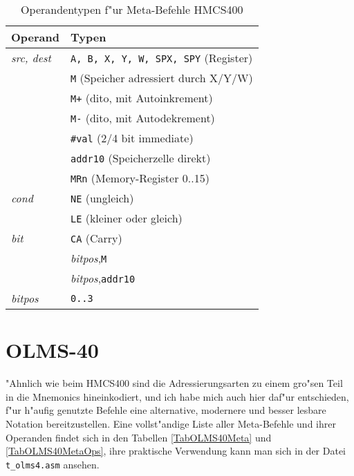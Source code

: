 \documentclass[12pt,a4paper,twoside]{report}
\newcommand{\tty}[1]{{\tt #1}}
\begin{document}
\begin{table*}
\begin{center}\begin{tabular}{|l|l|}
\hline
Operand                 & Typen \\
\hline
{\em src, dest}         & \tty{A, B, X, Y, W, SPX, SPY} (Register) \\
                        & \tty{M} (Speicher adressiert durch X/Y/W) \\
                        & \tty{M+} (dito, mit Autoinkrement) \\
                        & \tty{M-} (dito, mit Autodekrement) \\
                        & \tty{\#val} (2/4 bit immediate) \\
                        & \tty{addr10} (Speicherzelle direkt) \\
                        & \tty{MRn} (Memory-Register 0..15) \\
{\em cond}              & \tty{NE} (ungleich) \\
                        & \tty{LE} (kleiner oder gleich) \\
{\em bit}               & \tty{CA} (Carry) \\
                        & {\em bitpos},\tty{M} \\
                        & {\em bitpos},\tty{addr10} \\
{\em bitpos}            & \tty{0..3} \\
\hline
\end{tabular}\end{center}
\caption{Operandentypen f"ur Meta-Befehle HMCS400}
\label{TabHMCS400MetaOps}
\end{table*}


\section{OLMS-40}

"Ahnlich wie beim HMCS400 sind die Adressierungsarten zu einem
gro"sen Teil in die Mnemonics hineinkodiert, und ich habe mich
auch hier daf"ur entschieden, f"ur h"aufig genutzte Befehle eine
alternative, modernere und besser lesbare Notation
bereitzustellen.
Eine vollst"andige Liste aller Meta-Befehle und ihrer Operanden
findet sich in den Tabellen \ref{TabOLMS40Meta} und
\ref{TabOLMS40MetaOps}, ihre praktische Verwendung kann man sich
in der Datei \tty{t\_olms4.asm} ansehen.
\end{document}
